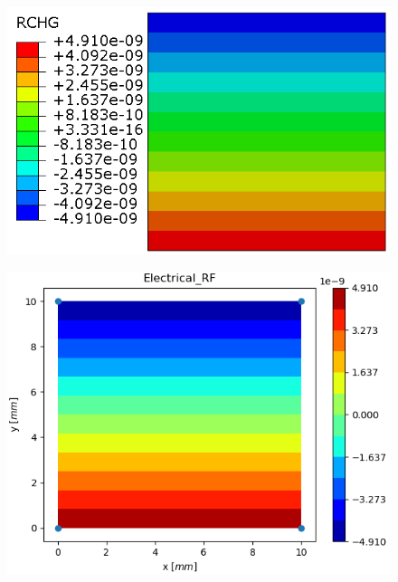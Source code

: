 \documentclass[11pt]{article}
\begin{document}
\begin{figure}[H]
	\centering
	\begin{minipage}{.5\textwidth}
		\centering
		\includegraphics[width=1\linewidth]{E1RCHG.png}
		\label{E1RCHG}
	\end{minipage}%
	\begin{minipage}{.5\textwidth}
		\centering
		\includegraphics[width=1\linewidth]{E1RCHG_IGA.png}
		\label{E1RCHG_IGA}
	\end{minipage}
\end{figure}
\end{document}
